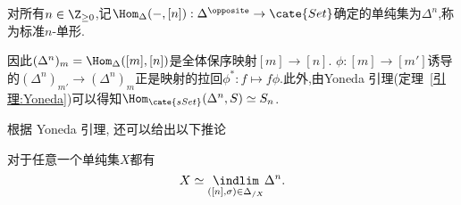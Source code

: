 \begin{definition}[标准$n$-单形]
    对所有$n \in \Z_{\geq 0}$,记$\Hom_{\Delta}(-,[n]): \Delta^{\opposite}\to \cate{Set}$确定的单纯集为$\Delta^n$,称为标准$n$-单形.
\end{definition}
\begin{remark}
    因此$(\Delta^n)_m = \Hom_{\Delta}([m],[n])$是全体保序映射$[m]\to [n]$. $\phi: [m]\to [m']$诱导的$(\Delta^n)_{m'} \to (\Delta^n)_{m}$正是映射的拉回$\phi^* : f \mapsto f\phi$.此外,由Yoneda 引理(定理~\ref{引理:Yoneda})可以得知$\Hom_{\cate{sSet}}(\Delta^n,S) \simeq S_n$.
\end{remark}
根据 Yoneda 引理, 还可以给出以下推论
\begin{corollary}\label{Cor:单纯集逼近}
    对于任意一个单纯集$X$都有
    \[
    X \simeq \underset{([n],\sigma)\in\Delta_{/X} }{\indlim} \Delta^n.
    \]
\end{corollary}
